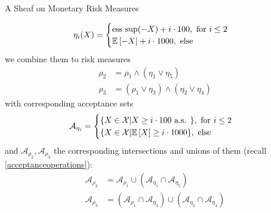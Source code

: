 \begin{subsection}{A Sheaf on Monetary Risk Measures}
\begin{example}
\begin{align*}
            \eta_i(X) = \begin{cases}
                \text{ess sup} (- X) + i\cdot 100, \text{ for } i \leq 2 \\
                 \mathbb{E} \left [-X \right] + i \cdot 1000, \text{ else}
            \end{cases}
        \end{align*}
        we combine them to risk measures 
        \begin{align*}
            \rho_2 &= \rho_1 \wedge (\eta_1 \vee \eta_5) \\
            \rho_3 &= (\rho_1 \vee \eta_3) \wedge (\eta_2 \vee \eta_4)
        \end{align*}
        with corresponding acceptance sets
        \begin{align*}
            \mathcal{A}_{\eta_i} = \begin{cases}
                \{ X \in \mathcal{X} | X \geq i \cdot 100 \text{ a.s. } \}, \text{ for } i \leq 2 \\
                \{ X \in \mathcal{X} | \mathbb{E} \left [X \right] \geq i \cdot 1000 \}, \text{ else}
            \end{cases}
        \end{align*}
        and \( \mathcal{A}_{\rho_2}, \mathcal{A}_{\rho_3} \) the corresponding intersections and unions of them (recall \ref{acceptanceoperations}):
        \begin{align*}
            \mathcal{A}_{\rho_2} &= \mathcal{A}_{\rho_1} \cup (\mathcal{A}_{\eta_1} \cap \mathcal{A}_{\eta_5}) \\
            \mathcal{A}_{\rho_3} &= \left(\mathcal{A}_{\rho_1} \cap \mathcal{A}_{\eta_3} \right) \cup \left(\mathcal{A}_{\eta_2} \cap \mathcal{A}_{\eta_4} \right)
        \end{align*}


\end{example}
\end{subsection}
